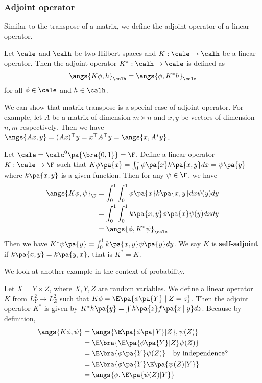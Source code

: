 \subsubsection{Adjoint operator} Similar to the transpose of a matrix, we define the adjoint operator of a
linear operator.
\begin{definition}
    Let $\cale$ and $\calh$ be two Hilbert spaces and $K:\cale\rightarrow\calh$ be a linear operator. Then the adjoint operator $K^*:\calh\rightarrow\cale$ is defined as
    \begin{equation*}
        \angs{K\phi,h}_{\calh}=\angs{\phi,K^*h}_{\cale}
    \end{equation*}
    for all $\phi\in\cale$ and $h\in\calh$.
\end{definition}
\begin{remark}
    We can show that matrix transpose is a special case of adjoint operator. For example, let $A$ be a matrix of dimension $m\times n$ and $x,y$ be vectors of dimension $n,m$ respectively. Then we have $\angs{Ax,y}=(Ax)^\top y= x^\top A^\top y = \angs{x,A^*y}$.
\end{remark}
\begin{example}
    Let $\cale = \calc^0\pa{\bra{0,1}}=\F$. Define a linear operator $K:\cale\rightarrow\F$ such that $K\phi\pa{x}=\int_0^1\phi\pa{x}k\pa{x,y}dx= \psi\pa{y}$ where $k\pa{x,y}$ is a given function. Then for any $\psi\in \F$, we have \begin{equation*}
        \begin{split}
            \angs{K\phi,\psi}_{\F}&=\int_0^1\int_0^1\phi\pa{x}k\pa{x,y}dx\psi(y)dy\\&=\int_0^1\int_0^1k\pa{x,y}\phi\pa{x}\psi(y)dxdy\\&=\angs{\phi,K^*\psi}_{\cale}
        \end{split}
    \end{equation*} Then we have $K^*\psi\pa{y}=\int_0^1k\pa{x,y}\psi\pa{y}dy$. We say $K$ is \textbf{self-adjoint} if $k\pa{x,y}=k\pa{y,x}$, that is $K^*=K$.
\end{example}
We look at another example in the context of probability.
\begin{example}
    Let $X=Y \times Z$, where $X,Y,Z$ are random variables. We define a linear operator $K$ from $L_Y^2 \to L_Z^2$ such that $K\phi=\E\pa{\phi\pa{Y}\mid Z=z}$. Then the adjoint operator $K^*$ is given by $K^*h\pa{y}=\int h\pa{z}f\pa{z\mid y}dz$. Because by definition,
    \begin{equation*}
        \begin{split}
            \angs{K\phi,\psi}&=\angs{\E\pa{\phi\pa{Y}|Z},\psi(Z)}\\
            & = \E\bra{\E\pa{\phi\pa{Y}| Z}\psi(Z)}\\
            & = \E\bra{\phi\pa{Y}\psi(Z)}\quad \text{by independence?}\\
            & = \E\bra{\phi\pa{Y}\E\pa{\psi(Z)| Y}}\\
            & = \angs{\phi,\E\pa{\psi(Z)| Y}}
        \end{split}
    \end{equation*}
\end{example}

